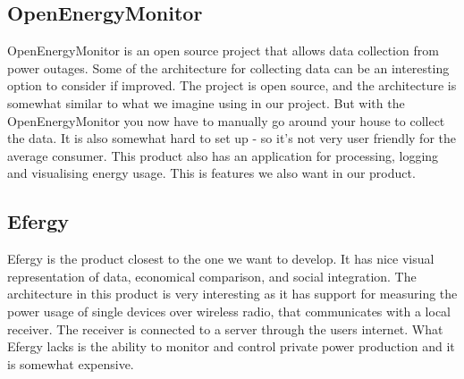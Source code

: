 \subsection{OpenEnergyMonitor}

OpenEnergyMonitor\cite{openenergymonitor} is an open source project that allows data collection from power outages. Some of the architecture for collecting data can be an interesting option to consider if improved. The project is open source, and the architecture is somewhat similar to what we imagine using in our project. But with the OpenEnergyMonitor you now have to manually go around your house to collect the data. It is also somewhat hard to set up - so it’s not very user friendly for the average consumer.  This product also has an application for processing, logging and visualising energy usage. This is features we also want in our product. 



\subsection{Efergy}

Efergy\cite{efergy} is the product closest to the one we want to develop. It has nice visual representation of data, economical comparison, and social integration. The architecture in this product is very interesting as it has support for measuring the power usage of single devices over wireless radio, that communicates with a local receiver. The receiver is connected to a server through the users internet. What Efergy lacks is the ability to monitor and control private power production and it is somewhat expensive.



